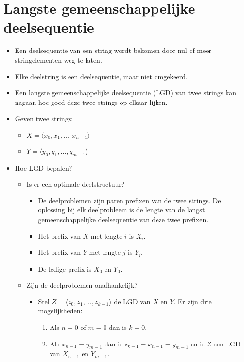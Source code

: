 \section{Langste gemeenschappelijke deelsequentie}
\begin{itemize}
    \item Een deelsequentie van een string wordt bekomen door nul of meer stringelementen weg te laten.
    \item Elke deelstring is een deelsequentie, maar niet omgekeerd.
    \item Een langste gemeenschappelijke deelsequentie (LGD) van twee strings kan nagaan hoe goed deze twee strings op elkaar lijken.
    \item Geven twee strings:
    \begin{itemize}
        \item $X = \langle x_0, x_1, \dots, x_{n - 1}\rangle$
        \item $Y = \langle y_0, y_1, \dots, y_{m - 1}\rangle$
    \end{itemize}
    \item Hoe LGD bepalen?
    \begin{itemize}
        \item Is er een optimale deelstructuur?
        \begin{itemize}
            \item De deelproblemen zijn paren prefixen van de twee strings. De oplossing bij elk deelprobleem is de lengte van de langst gemeenschappelijke deelsequentie van deze twee prefixen.
            \item Het prefix van $X$ met lengte $i$ is $X_i$.
            \item Het prefix van $Y$ met lengte $j$ is $Y_j$.
            \item De ledige prefix is $X_0$ en $Y_0$.
        \end{itemize}
        \item Zijn de deelproblemen onafhankelijk?
        \begin{itemize}
            \item Stel $Z = \langle z_0, z_1, \dots, z_{k - 1} \rangle$ de LGD van $X$ en $Y$. Er zijn drie mogelijkheden:
            \begin{enumerate}
                \item Als $n = 0$ of $m = 0$ dan is $k = 0$.
                \item Als $x_{n - 1} = y_{m - 1}$ dan is $z_{k - 1} = x_{n - 1} = y_{m - 1}$ en is $Z$ een LGD van $X_{n - 1}$ en $Y_{m - 1}$.

\end{enumerate}
\end{itemize}
\end{itemize}
\end{itemize}
